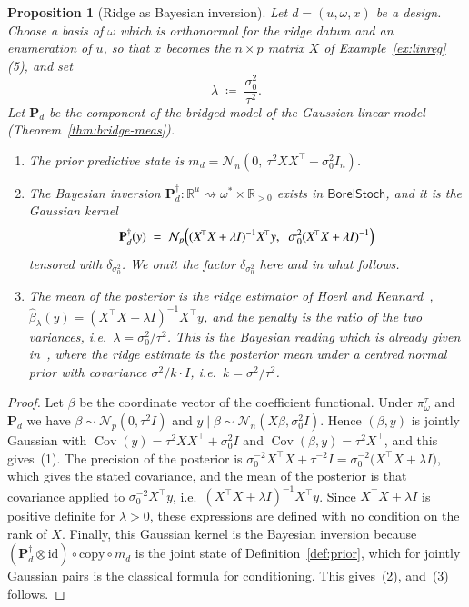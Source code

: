 \documentclass[11pt,a4paper]{article}
\theoremstyle{plain}
\newtheorem{proposition}[theorem]{Proposition}
\theoremstyle{definition}
\theoremstyle{remark}
\newcommand{\cat}[1]{\mathsf{#1}}
\newcommand{\id}{\mathrm{id}}
\newcommand{\R}{\mathbb{R}}
\newcommand{\Norm}{\mathcal{N}}
\newcommand{\BorelStoch}{\cat{BorelStoch}}
\begin{document}
\begin{proposition}[Ridge as Bayesian inversion]\label{prop:ridge}
Let $d = (u,\omega,x)$ be a design. Choose a basis of $\omega$ which is
orthonormal for the ridge datum and an enumeration of $u$, so that $x$ becomes
the $n \times p$ matrix $X$ of Example~\ref{ex:linreg}(5), and set
\[
\lambda \;\coloneqq\; \frac{\sigma_{0}^{2}}{\tau^{2}} .
\]
Let $\mathbf{P}_{d}$ be the component of the bridged model of the Gaussian
linear model (Theorem~\ref{thm:bridge-meas}).
\begin{enumerate}
\item The prior predictive state is
$m_{d} = \Norm_{n}(0,\ \tau^{2} X X^{\!\top} + \sigma_{0}^{2} I_{n})$.
\item The Bayesian inversion
$\mathbf{P}_{d}^{\dagger} \colon \R^{u} \rightsquigarrow
\omega^{*}\times\R_{>0}$ exists in $\BorelStoch$, and it is the Gaussian kernel
\[
\mathbf{P}_{d}^{\dagger}(y)
\;=\;
\Norm_{p}\Bigl(
(X^{\!\top}X + \lambda I)^{-1} X^{\!\top} y,
\;\;
\sigma_{0}^{2}(X^{\!\top}X + \lambda I)^{-1}
\Bigr)
\]
tensored with $\delta_{\sigma_{0}^{2}}$. We omit the factor
$\delta_{\sigma_{0}^{2}}$ here and in what follows.
\item The mean of the posterior is the ridge estimator of Hoerl and
Kennard~\cite[eq.~(2.1), p.~57]{hoerl_ridge_1970},
$\widehat{\beta}_{\lambda}(y) = (X^{\!\top}X + \lambda I)^{-1} X^{\!\top} y$,
and the penalty is the ratio of the two variances, i.e.\
$\lambda = \sigma_{0}^{2}/\tau^{2}$. This is the Bayesian reading which is
already given in~\cite[\S6, p.~64]{hoerl_ridge_1970}, where the ridge estimate
is the posterior mean under a centred normal prior with covariance
$\sigma^{2}/k\cdot I$, i.e.\ $k = \sigma^{2}/\tau^{2}$.
\end{enumerate}
\end{proposition}

\begin{proof}
Let $\beta$ be the coordinate vector of the coefficient functional. Under
$\pi^{\tau}_{\omega}$ and $\mathbf{P}_{d}$ we have
$\beta \sim \Norm_{p}(0,\tau^{2}I)$ and
$y \mid \beta \sim \Norm_{n}(X\beta, \sigma_{0}^{2}I)$. Hence $(\beta,y)$ is
jointly Gaussian with
$\operatorname{Cov}(y) = \tau^{2}XX^{\!\top} + \sigma_{0}^{2}I$ and
$\operatorname{Cov}(\beta,y) = \tau^{2}X^{\!\top}$, and this gives~(1). The
precision of the posterior is
$\sigma_{0}^{-2}X^{\!\top}X + \tau^{-2}I
= \sigma_{0}^{-2}\bigl(X^{\!\top}X + \lambda I\bigr)$, which gives the stated
covariance, and the mean of the posterior is that covariance applied to
$\sigma_{0}^{-2}X^{\!\top}y$, i.e.\
$(X^{\!\top}X+\lambda I)^{-1}X^{\!\top}y$. Since $X^{\!\top}X + \lambda I$ is
positive definite for $\lambda>0$, these expressions are defined with no
condition on the rank of $X$. Finally, this Gaussian kernel is the Bayesian
inversion because
$(\mathbf{P}_{d}^{\dagger} \otimes \id) \circ \mathrm{copy} \circ m_{d}$ is the
joint state of Definition~\ref{def:prior}, which for jointly Gaussian pairs is
the classical formula for conditioning. This gives~(2), and~(3) follows.
\end{proof}
\end{document}
